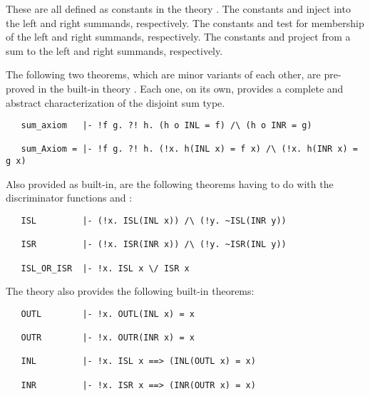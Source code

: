 \noindent These are all defined as constants in the theory .  The
constants  and  inject into the left and right summands,
respectively. The constants  and  test for membership of the
left and right summands, respectively. The constants  and 
project from a sum to the left and right summands, respectively.

The following two theorems, which are minor variants of each other, are
pre-proved in the built-in theory . Each one, on its own, provides a
complete and abstract characterization of the disjoint sum type.

\begin{hol}
\begin{verbatim}
   sum_axiom   |- !f g. ?! h. (h o INL = f) /\ (h o INR = g)

   sum_Axiom = |- !f g. ?! h. (!x. h(INL x) = f x) /\ (!x. h(INR x) = g x)
\end{verbatim}\end{hol}

\noindent Also provided as built-in, are the following theorems having to
do with the discriminator functions  and :

\begin{hol}
\begin{verbatim}
   ISL         |- (!x. ISL(INL x)) /\ (!y. ~ISL(INR y))

   ISR         |- (!x. ISR(INR x)) /\ (!y. ~ISR(INL y))

   ISL_OR_ISR  |- !x. ISL x \/ ISR x
\end{verbatim}\end{hol}

\noindent The  theory also provides the following built-in theorems:

\begin{hol}
\begin{verbatim}
   OUTL        |- !x. OUTL(INL x) = x

   OUTR        |- !x. OUTR(INR x) = x

   INL         |- !x. ISL x ==> (INL(OUTL x) = x)

   INR         |- !x. ISR x ==> (INR(OUTR x) = x)
\end{verbatim}\end{hol}

